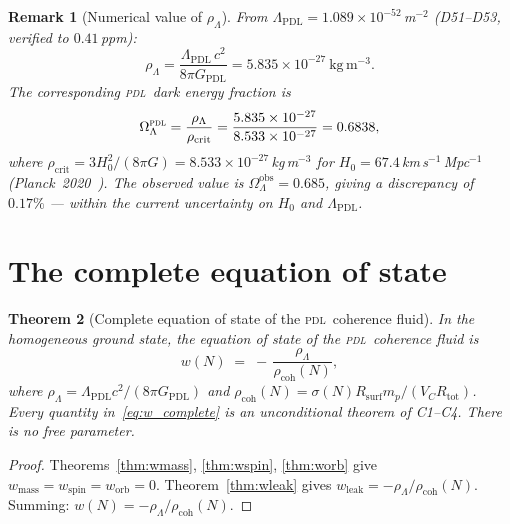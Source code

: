 \documentclass[12pt,a4paper]{article}
\newtheorem{theorem}{Theorem}[section]
\newtheorem{remark}[theorem]{Remark}
\newcommand{\PDL}{\textsc{pdl}}
\newcommand{\rhocoh}{\rho_{\mathrm{coh}}}
\newcommand{\sig}{\sigma}
\newcommand{\GPDL}{G_{\mathrm{PDL}}}
\newcommand{\VC}{V_C}
\newcommand{\LambdaPDL}{\Lambda_{\mathrm{PDL}}}
\newcommand{\rhoLambda}{\rho_\Lambda}
\newcommand{\Rsurf}{R_{\mathrm{surf}}}
\newcommand{\Rtot}{R_{\mathrm{tot}}}
\newcommand{\OmegaL}{\Omega_\Lambda}
\begin{document}
\begin{remark}[Numerical value of $\rhoLambda$]
\label{rem:rhoLambda}
From $\LambdaPDL = 1.089\times10^{-52}$\,m$^{-2}$ (D51--D53, verified to $0.41$\,ppm):
\begin{equation}
\rhoLambda = \frac{\LambdaPDL\,c^2}{8\pi\GPDL} = 5.835\times10^{-27}\ \mathrm{kg\,m^{-3}}.
\label{eq:rhoLambda}
\end{equation}
The corresponding \PDL\ dark energy fraction is
\begin{equation}
\OmegaL^{\PDL} = \frac{\rhoLambda}{\rho_{\mathrm{crit}}} = \frac{5.835\times10^{-27}}{8.533\times10^{-27}} = 0.6838,
\label{eq:OmegaL_PDL}
\end{equation}
where $\rho_{\mathrm{crit}} = 3H_0^2/(8\pi G) = 8.533\times10^{-27}$\,kg\,m$^{-3}$ for $H_0 = 67.4$\,km\,s$^{-1}$\,Mpc$^{-1}$ (Planck~2020~\cite{Planck_2020}). The observed value is $\OmegaL^{\mathrm{obs}} = 0.685$, giving a discrepancy of $0.17\%$ --- within the current uncertainty on $H_0$ and $\LambdaPDL$.
\end{remark}

\section{The complete equation of state}
\label{sec:complete}

\begin{theorem}[Complete equation of state of the \PDL\ coherence fluid]
\label{thm:w_complete}
In the homogeneous ground state, the equation of state of the \PDL\ coherence fluid is
\begin{equation}
\boxed{w(N) \;=\; -\,\frac{\rhoLambda}{\rhocoh(N)},}
\label{eq:w_complete}
\end{equation}
where $\rhoLambda = \LambdaPDL c^2/(8\pi\GPDL)$ and $\rhocoh(N) = \sig(N)\Rsurf m_p/(\VC\Rtot)$. Every quantity in~\eqref{eq:w_complete} is an unconditional theorem of C1--C4. There is no free parameter.
\end{theorem}

\begin{proof}
Theorems~\ref{thm:wmass}, \ref{thm:wspin}, \ref{thm:worb} give $w_{\mathrm{mass}} = w_{\mathrm{spin}} = w_{\mathrm{orb}} = 0$. Theorem~\ref{thm:wleak} gives $w_{\mathrm{leak}} = -\rhoLambda/\rhocoh(N)$. Summing: $w(N) = -\rhoLambda/\rhocoh(N)$.
\end{proof}
\end{document}
